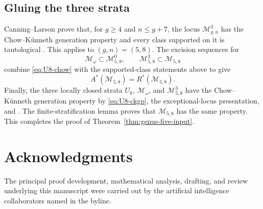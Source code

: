 \documentclass[12pt,reqno]{amsart}
\newcommand{\M}{\mathcal{M}}
\theoremstyle{definition}
\theoremstyle{remark}
\begin{document}
\subsection{Gluing the three strata}

Canning--Larson prove that, for $g\geq4$ and $n\leq g+7$, the locus
$\M^3_{g,n}$ has the Chow--K\"unneth generation property and every class
supported on it is tautological
\cite[Lemma~9.9]{CanningLarsonStable}.  This applies to $(g,n)=(5,8)$.
The excision sequences for
\[
 \M_\omega\subset\M^0_{5,8},\qquad
 \M^3_{5,8}\subset\M_{5,8}
\]
combine \eqref{eq:U8-chow} with the supported-class statements above to give
\[
 A^*(\M_{5,8})=R^*(\M_{5,8}).
\]
Finally, the three locally closed strata
$U_8$, $\M_\omega$, and $\M^3_{5,8}$ have the Chow--K\"unneth generation
property by \eqref{eq:U8-ckgp}, the exceptional-locus presentation, and
\cite[Lemma~9.9]{CanningLarsonStable}.  The finite-stratification lemma
\cite[Lemma~3.4]{CanningLarsonStable} proves that $\M_{5,8}$ has the same
property.  This completes the proof of Theorem~\ref{thm:genus-five-input}.

\section*{Acknowledgments}

The principal proof development, mathematical analysis, drafting, and review
underlying this manuscript were carried out by the artificial intelligence
collaborators named in the byline.
\end{document}
